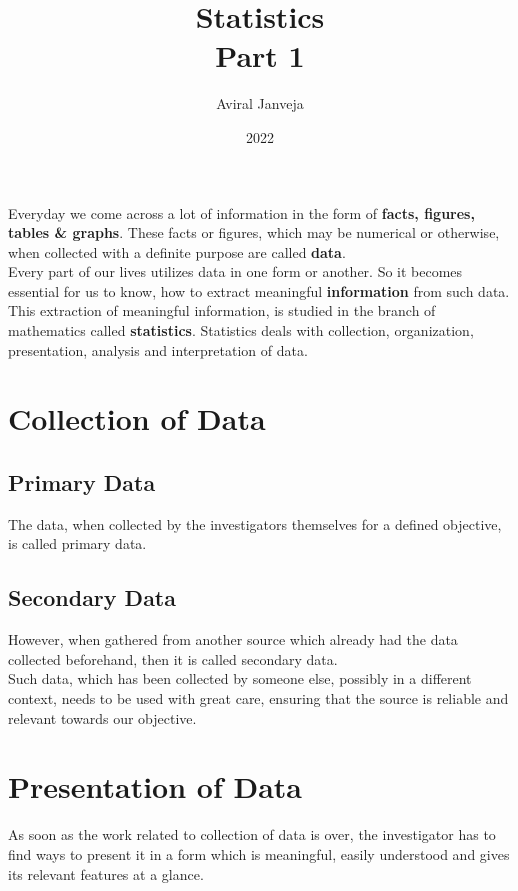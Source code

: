 \documentclass[12pt, letterpaper]{article}
\title{\textbf{\Huge Statistics \\ Part 1}}
\author{Aviral Janveja}
\date{2022}
\begin{document}
\maketitle
  
Everyday we come across a lot of information in the form of \textbf{facts, figures, tables \& graphs}. These facts or figures, which may be numerical or otherwise, when collected with a definite purpose are called \textbf{data}.\\
Every part of our lives utilizes data in one form or another. So it becomes essential for us to know, how to extract meaningful \textbf{information} from such data.\\
This extraction of meaningful information, is studied in the branch of mathematics called \textbf{statistics}. Statistics deals with collection, organization, presentation, analysis and interpretation of data.

\section{Collection of Data}
\subsection{Primary Data}
The data, when collected by the investigators themselves
for a defined objective, is called primary data.

\subsection{Secondary Data}
However, when gathered from another source which already had the data collected beforehand, then it is called secondary data.\\
Such data, which has been collected by someone else, possibly in a different context, needs to be used with great care, ensuring that the source is reliable and relevant towards our objective.


\section{Presentation of Data}
As soon as the work related to collection of data is over, the investigator has to find ways to present it in a form which is meaningful, easily understood and gives its relevant features at a glance. 
\end{document}
